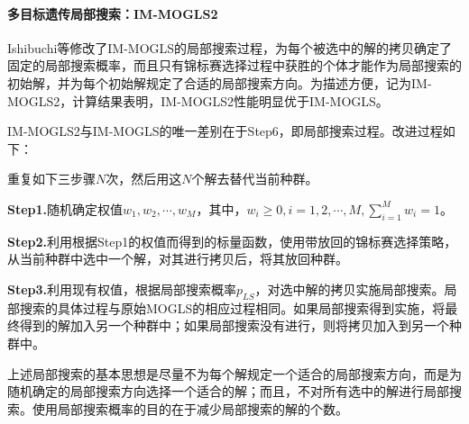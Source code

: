            \paragraph{多目标遗传局部搜索：IM-MOGLS2}
            Ishibuchi等修改了IM-MOGLS的局部搜索过程，为每个被选中的解的拷贝确定了固定的局部搜索概率，而且只有锦标赛选择过程中获胜的个体才能作为局部搜索的初始解，并为每个初始解规定了合适的局部搜索方向。为描述方便，记为IM-MOGLS2，计算结果表明，IM-MOGLS2性能明显优于IM-MOGLS。
            \par
            IM-MOGLS2与IM-MOGLS的唯一差别在于Step6，即局部搜索过程。改进过程如下：
            \par
            重复如下三步骤$N$次，然后用这$N$个解去替代当前种群。
            \par
            \textbf{Step1.}随机确定权值$w_1,w_2,\cdots,w_M$，其中，$w_i\ge 0,i=1,2,\cdots,M,\mathop{\sum}\limits_{i=1}^Mw_i=1$。
            \par
            \textbf{Step2.}利用根据Step1的权值而得到的标量函数，使用带放回的锦标赛选择策略，从当前种群中选中一个解，对其进行拷贝后，将其放回种群。
            \par
            \textbf{Step3.}利用现有权值，根据局部搜索概率$p_{LS}$，对选中解的拷贝实施局部搜索。局部搜索的具体过程与原始MOGLS的相应过程相同。如果局部搜索得到实施，将最终得到的解加入另一个种群中；如果局部搜索没有进行，则将拷贝加入到另一个种群中。
            \par
            上述局部搜索的基本思想是尽量不为每个解规定一个适合的局部搜索方向，而是为随机确定的局部搜索方向选择一个适合的解；而且，不对所有选中的解进行局部搜索。使用局部搜索概率的目的在于减少局部搜索的解的个数。

